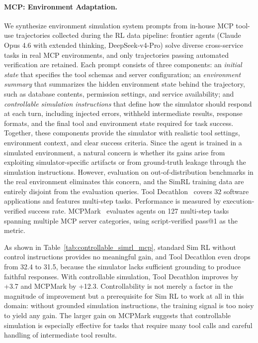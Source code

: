 \documentclass{llmxive}
\begin{document}
\paragraph{MCP: Environment Adaptation.}
We synthesize environment simulation system prompts from in-house MCP tool-use trajectories collected during the RL data pipeline: frontier agents (Claude Opus 4.6 with extended thinking, DeepSeek-v4-Pro) solve diverse cross-service tasks in real MCP environments, and only trajectories passing automated verification are retained.
Each prompt consists of three components: an \emph{initial state} that specifies the tool schemas and server configuration; an \emph{environment summary} that summarizes the hidden environment state behind the trajectory, such as database contents, permission settings, and service availability; and \emph{controllable simulation instructions} that define how the simulator should respond at each turn, including injected errors, withheld intermediate results, response formats, and the final tool and environment state required for task success.
Together, these components provide the simulator with realistic tool settings, environment context, and clear success criteria.
Since the agent is trained in a simulated environment, a natural concern is whether its gains arise from exploiting simulator-specific artifacts or from ground-truth leakage through the simulation instructions.
However, evaluation on out-of-distribution benchmarks in the real environment eliminates this concern, and the SimRL training data are entirely disjoint from the evaluation queries.
Tool Decathlon~\citep{li2025tool} covers 32 software applications and features multi-step tasks. Performance is measured by execution-verified success rate.
MCPMark~\citep{wu2025mcpmark} evaluates agents on 127 multi-step tasks spanning multiple MCP server categories, using script-verified pass@1 as the metric.

As shown in Table~\ref{tab:controllable_simrl_mcp}, standard Sim RL without control instructions provides no meaningful gain, and Tool Decathlon even drops from 32.4 to 31.5, because the simulator lacks sufficient grounding to produce faithful responses.
With controllable simulation, Tool Decathlon improves by +3.7 and MCPMark by +12.3.
Controllability is not merely a factor in the magnitude of improvement but a prerequisite for Sim RL to work at all in this domain: without grounded simulation instructions, the training signal is too noisy to yield any gain.
The larger gain on MCPMark suggests that controllable simulation is especially effective for tasks that require many tool calls and careful handling of intermediate tool results.
\end{document}
